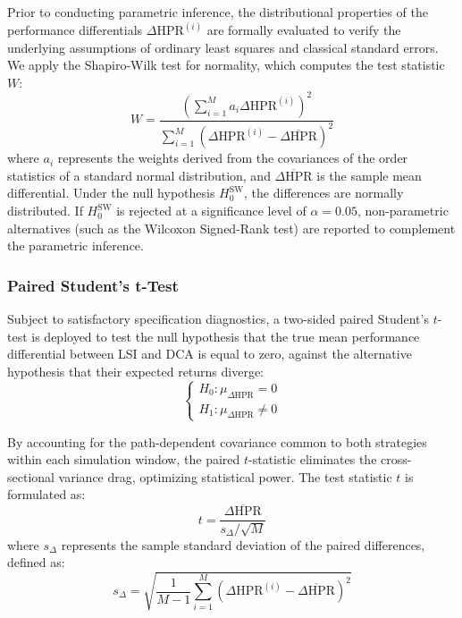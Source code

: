 \documentclass[11pt,a4paper]{article}
\begin{document}
Prior to conducting parametric inference, the distributional properties of the performance differentials $\Delta\text{HPR}^{(i)}$ are formally evaluated to verify the underlying assumptions of ordinary least squares and classical standard errors. We apply the Shapiro-Wilk test for normality, which computes the test statistic $W$:
\begin{equation}
W = \frac{\left(\sum_{i=1}^M a_i \Delta\text{HPR}^{(i)}\right)^2}{\sum_{i=1}^M \left(\Delta\text{HPR}^{(i)} - \overline{\Delta\text{HPR}}\right)^2}
\end{equation}
where $a_i$ represents the weights derived from the covariances of the order statistics of a standard normal distribution, and $\overline{\Delta\text{HPR}}$ is the sample mean differential. Under the null hypothesis $H_0^{\text{SW}}$, the differences are normally distributed. If $H_0^{\text{SW}}$ is rejected at a significance level of $\alpha = 0.05$, non-parametric alternatives (such as the Wilcoxon Signed-Rank test) are reported to complement the parametric inference.

\subsubsection{Paired Student's t-Test}

Subject to satisfactory specification diagnostics, a two-sided paired Student's $t$-test is deployed to test the null hypothesis that the true mean performance differential between LSI and DCA is equal to zero, against the alternative hypothesis that their expected returns diverge:
\begin{equation}
\begin{cases}
H_0: \mu_{\Delta\text{HPR}} = 0 \\
H_1: \mu_{\Delta\text{HPR}} \neq 0
\end{cases}
\end{equation}

By accounting for the path-dependent covariance common to both strategies within each simulation window, the paired $t$-statistic eliminates the cross-sectional variance drag, optimizing statistical power. The test statistic $t$ is formulated as:
\begin{equation}
t = \frac{\overline{\Delta\text{HPR}}}{s_{\Delta} / \sqrt{M}}
\end{equation}
where $s_{\Delta}$ represents the sample standard deviation of the paired differences, defined as:
\begin{equation}
s_{\Delta} = \sqrt{\frac{1}{M-1} \sum_{i=1}^M \left(\Delta\text{HPR}^{(i)} - \overline{\Delta\text{HPR}}\right)^2}
\end{equation}
\end{document}
